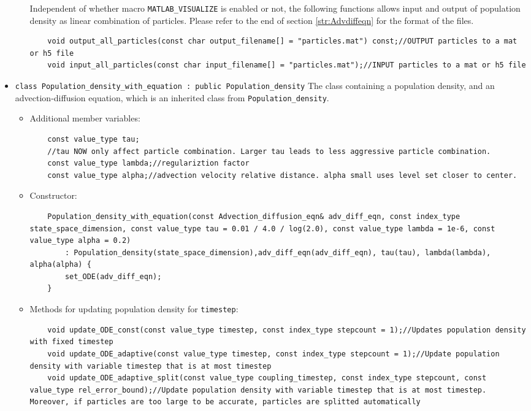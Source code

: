 \documentclass[10pt]{article} %
\begin{document}
\begin{itemize}
\begin{itemize}
Independent of whether macro \texttt{MATLAB\_VISUALIZE} is enabled or not, the following functions allows input and output of population density as linear combination of particles. Please refer to the end of section \ref{str:Advdiffeqn} for the format of the files. 
\begin{lstlisting}
	void output_all_particles(const char output_filename[] = "particles.mat") const;//OUTPUT particles to a mat or h5 file
	void input_all_particles(const char input_filename[] = "particles.mat");//INPUT particles to a mat or h5 file
\end{lstlisting}
\end{itemize}
\item
\texttt{class Population\_density\_with\_equation : public Population\_density} The class containing a population density, and an advection-diffusion equation, which is an inherited class from \texttt{Population\_density}. 
\begin{itemize}
\item
Additional member variables:
\begin{lstlisting}
	const value_type tau;
	//tau NOW only affect particle combination. Larger tau leads to less aggressive particle combination.
    const value_type lambda;//regulariztion factor
    const value_type alpha;//advection velocity relative distance. alpha small uses level set closer to center.
\end{lstlisting}
\item
Constructor:
\begin{lstlisting}
    Population_density_with_equation(const Advection_diffusion_eqn& adv_diff_eqn, const index_type state_space_dimension, const value_type tau = 0.01 / 4.0 / log(2.0), const value_type lambda = 1e-6, const value_type alpha = 0.2)
        : Population_density(state_space_dimension),adv_diff_eqn(adv_diff_eqn), tau(tau), lambda(lambda), alpha(alpha) {
        set_ODE(adv_diff_eqn);
    }
\end{lstlisting}
\item
Methods for updating population density for \texttt{timestep}:
\begin{lstlisting}
    void update_ODE_const(const value_type timestep, const index_type stepcount = 1);//Updates population density with fixed timestep
    void update_ODE_adaptive(const value_type timestep, const index_type stepcount = 1);//Update population density with variable timestep that is at most timestep
    void update_ODE_adaptive_split(const value_type coupling_timestep, const index_type stepcount, const value_type rel_error_bound);//Update population density with variable timestep that is at most timestep. Moreover, if particles are too large to be accurate, particles are splitted automatically

\end{lstlisting}
\end{itemize}
\end{itemize}
\end{document}
